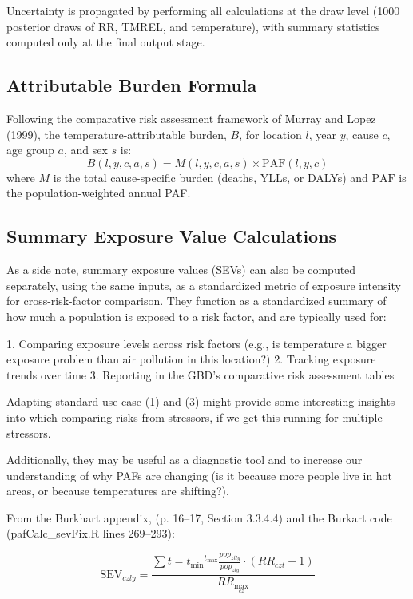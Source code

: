 \documentclass[11pt,a4paper]{article}
\begin{document}
Uncertainty is propagated by performing all calculations at the draw level (1000 posterior draws of RR, TMREL, and temperature), with summary statistics computed only at the final output stage.

\subsection{Attributable Burden Formula}

Following the comparative risk assessment framework of Murray and Lopez (1999), the temperature-attributable burden, $B$, for location $l$, year $y$, cause $c$, age group $a$, and sex $s$ is:
\begin{equation}
  B(l,y,c,a,s) = M(l,y,c,a,s) \times \text{PAF}(l,y,c)
  \label{eq:burden}
\end{equation}
where $M$ is the total cause-specific burden (deaths, YLLs, or DALYs) and $\text{PAF}$ is the population-weighted annual PAF.

\subsection{Summary Exposure Value Calculations}

As a side note, summary exposure values (SEVs) can also be computed
separately, using the same inputs, as a standardized metric of
exposure intensity for cross-risk-factor comparison. They function as
a standardized summary of how much a population is exposed to a risk
factor, and are typically used for:

  1. Comparing exposure levels across risk factors (e.g., is temperature a bigger exposure problem than air
   pollution in this location?)
  2. Tracking exposure trends over time
  3. Reporting in the GBD's comparative risk assessment tables

  Adapting standard use case (1) and (3) might provide some interesting insights into which comparing risks from stressors, if we get this running for multiple stressors.

  Additionally, they may be useful as a diagnostic tool and to
  increase our understanding of why PAFs are changing (is it because
  more people live in hot areas, or because temperatures are
  shifting?).

  From the Burkhart appendix, (p. 16–17, Section 3.3.4.4) and the Burkart code\\ (pafCalc_sevFix.R lines 269–293):

  $$\text{SEV}_{czly} = \frac{\displaystyle\sum{t=t_{\min}}^{t_{\max}} \frac{pop_{ztly}}{pop_{zly}} \cdot
  (RR_{czt} - 1)}{RR_{\max_{cz}}}$$
\end{document}
